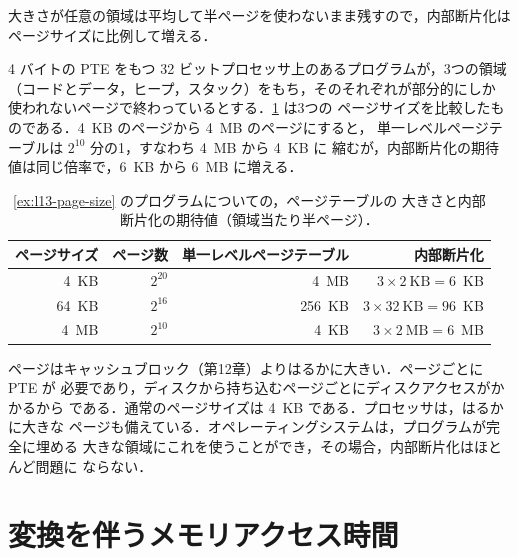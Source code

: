 \documentclass[../main.tex]{subfiles}
\begin{document}
大きさが任意の領域は平均して半ページを使わないまま残すので，内部断片化は
ページサイズに比例して増える．

\begin{example}
  \label{ex:l13-page-size}
  4 バイトの PTE をもつ 32 ビットプロセッサ上のあるプログラムが，3つの領域
  （コードとデータ，ヒープ，スタック）をもち，そのそれぞれが部分的にしか
  使われないページで終わっているとする．\cref{tab:l13-page-size} は3つの
  ページサイズを比較したものである．4~KB のページから 4~MB のページにすると，
  単一レベルページテーブルは $2^{10}$ 分の1，すなわち 4~MB から 4~KB に
  縮むが，内部断片化の期待値は同じ倍率で，6~KB から 6~MB に増える．
\end{example}

\begin{table}[htbp]
  \centering\small
  \caption{\cref{ex:l13-page-size} のプログラムについての，ページテーブルの
    大きさと内部断片化の期待値（領域当たり半ページ）．}
  \label{tab:l13-page-size}
  \begin{tabular}{@{}rrrr@{}}
    \toprule
    ページサイズ & ページ数 & 単一レベルページテーブル & 内部断片化 \\
    \midrule
    4~KB  & $2^{20}$ & 4~MB   & $3 \times 2~\text{KB} = 6$~KB \\
    64~KB & $2^{16}$ & 256~KB & $3 \times 32~\text{KB} = 96$~KB \\
    4~MB  & $2^{10}$ & 4~KB   & $3 \times 2~\text{MB} = 6$~MB \\
    \bottomrule
  \end{tabular}
\end{table}

ページはキャッシュブロック（第12章）よりはるかに大きい．ページごとに PTE が
必要であり，ディスクから持ち込むページごとにディスクアクセスがかかるから
である．通常のページサイズは 4~KB である．プロセッサは，はるかに大きな
ページも備えている．オペレーティングシステムは，プログラムが完全に埋める
大きな領域にこれを使うことができ，その場合，内部断片化はほとんど問題に
ならない．

\section{変換を伴うメモリアクセス時間}
\label{sec:l13-access-time}
\end{document}

